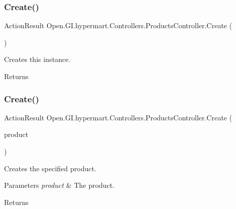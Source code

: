 \subsubsection{\texorpdfstring{Create()}{Create()}\hspace{0.1cm}{\footnotesize\ttfamily [1/2]}}
{\footnotesize\ttfamily Action\+Result Open.\+G\+I.\+hypermart.\+Controllers.\+Products\+Controller.\+Create (\begin{DoxyParamCaption}{ }\end{DoxyParamCaption})}



Creates this instance. 

\begin{DoxyReturn}{Returns}

\end{DoxyReturn}
\hypertarget{class_open_1_1_g_i_1_1hypermart_1_1_controllers_1_1_products_controller_aa3e20739b645a820cfea38aae81aff6a}{}\label{class_open_1_1_g_i_1_1hypermart_1_1_controllers_1_1_products_controller_aa3e20739b645a820cfea38aae81aff6a} 
\subsubsection{\texorpdfstring{Create()}{Create()}\hspace{0.1cm}{\footnotesize\ttfamily [2/2]}}
{\footnotesize\ttfamily Action\+Result Open.\+G\+I.\+hypermart.\+Controllers.\+Products\+Controller.\+Create (\begin{DoxyParamCaption}\item[{\mbox{[}\+Bind(\+Include = \char`\"{}\+I\+D,\+Title,\+Description,\+Tagline,\+Source\+Code,\+Lead,\char`\"{})\mbox{]} \hyperlink{class_open_1_1_g_i_1_1hypermart_1_1_models_1_1_product}{Product}}]{product }\end{DoxyParamCaption})}



Creates the specified product. 


\begin{DoxyParams}{Parameters}
{\em product} & The product.\\
\hline
\end{DoxyParams}
\begin{DoxyReturn}{Returns}

\end{DoxyReturn}
\hypertarget{class_open_1_1_g_i_1_1hypermart_1_1_controllers_1_1_products_controller_a2d8af2d76cdc650951f7f17f66778a62}{}\label{class_open_1_1_g_i_1_1hypermart_1_1_controllers_1_1_products_controller_a2d8af2d76cdc650951f7f17f66778a62} 
